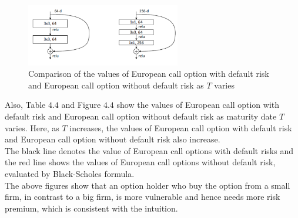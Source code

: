 \documentclass[pdf]{beamer}
\begin{document}
\begin{frame}[allowframebreaks]
\begin{figure}[hp]
	\includegraphics[width=0.60\textwidth]{png/bottleneck.png}
	\caption{Comparison of the values of European call option with default risk and European call option without default risk as $T$ varies}
	\label{fig:ife41}
\end{figure}
\small
Also, Table $4.4$ and Figure $4.4$ show the values of European call option with default risk and European call option without default risk as maturity date $T$ varies. Here, as $T$ increases, the values of European call option with default risk and European call option without default risk also increase.\\
	The black line denotes the value of European call options with default risks and the red line shows the values of European call options without default risk, evaluated by Black-Scholes formula.\\
	The above figures show that an option holder who buy the option from a small firm, in contrast to a big firm, is more vulnerable and hence needs more risk premium, which is consistent with the intuition.
\end{frame}
\small
\end{document}
